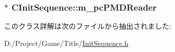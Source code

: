 \subsubsection[{m\+\_\+pc\+P\+M\+D\+Reader}]{$\ast$ C\+Init\+Sequence\+::m\+\_\+pc\+P\+M\+D\+Reader\hspace{0.3cm}{\ttfamily [private]}}\label{class_c_init_sequence_acb2968a68f82f21b579371f0d2533863}


このクラス詳解は次のファイルから抽出されました\+:\begin{DoxyCompactItemize}
\item 
D\+:/\+Project/\+Game/\+Title/\hyperlink{_init_sequence_8h}{Init\+Sequence.\+h}\end{DoxyCompactItemize}

